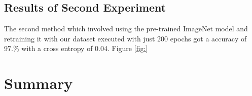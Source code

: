 \documentclass[12pt, a4paper,oneside]{report}
\begin{document}
\section{Results of Second Experiment}
The second method which involved using the pre-trained ImageNet model and retraining it with our dataset executed with just 200 epochs got a accuracy of 97.\% with a cross entropy of 0.04. Figure \ref{fig:}


\chapter{Summary}



\end{document}
